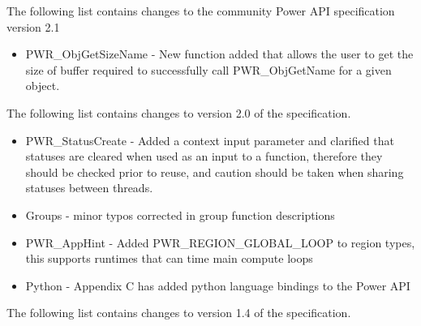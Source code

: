 The following list contains changes to the community Power API specification version 2.1
\begin{itemize}
  \item{PWR_ObjGetSizeName - New function added that allows the user to get the size of buffer required to successfully call PWR_ObjGetName for a given object.}

\end{itemize}


The following list contains changes to version 2.0 of the specification.
\begin{itemize}
  \item{PWR_StatusCreate - Added a context input parameter and clarified that statuses are cleared when used as an input to a function, therefore they should be checked prior to reuse, and caution should be taken when sharing statuses between threads.}
  \item{Groups - minor typos corrected in group function descriptions}
  \item{PWR_AppHint - Added PWR_REGION_GLOBAL_LOOP to region types, this supports runtimes that can time main compute loops}
  \item{Python - Appendix C has added python language bindings to the Power API}

\end{itemize}


The following list contains changes to version 1.4 of the specification.

